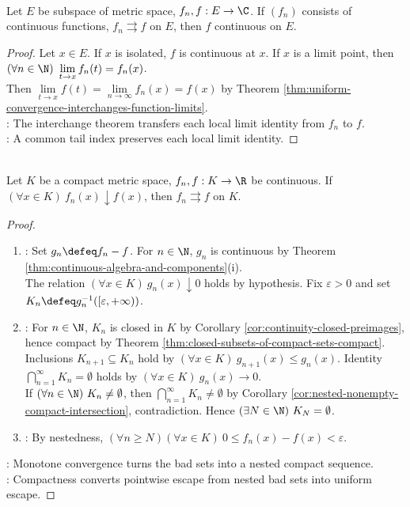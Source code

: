 \begin{theorem} \label{thm:uniform-convergence-preserves-continuity} \\
Let $E$ be subspace of metric space, $f_n,f:E\to\C$. If $(f_n)$ consists of continuous functions, $f_n\rightrightarrows f$ on $E$, then $f$ continuous on $E$.
\begin{proof}
Let $x\in E$. If $x$ is isolated, $f$ is continuous at $x$. If $x$ is a limit point, then $(\forall n\in\N)\ \lim\limits_{t\to x}f_n(t)=f_n(x)$.\\
Then $\lim\limits_{t\to x}f(t)=\lim\limits_{n\to\infty}f_n(x)=f(x)$ by Theorem \ref{thm:uniform-convergence-interchanges-function-limits}.\\
: The interchange theorem transfers each local limit identity from $f_n$ to $f$.\\
: A common tail index preserves each local limit identity.
\end{proof}
\end{theorem}

\begin{theorem} \label{thm:dini-monotone-uniform-convergence} \\
Let $K$ be a compact metric space, $f_n,f:K\to\R$ be continuous. If $(\forall x\in K)\ f_n(x)\downarrow f(x)$, then $f_n\rightrightarrows f$ on $K$.
\begin{proof}
\begin{enumerate}[label=(\roman*)]
\setlength{\itemsep}{0pt}
\item {}: Set $g_n\defeq f_n-f$. For $n\in\N$, $g_n$ is continuous by Theorem \ref{thm:continuous-algebra-and-components}(i).\\
The relation $(\forall x\in K)\ g_n(x)\downarrow0$ holds by hypothesis. Fix $\varepsilon>0$ and set $K_n\defeq g_n^{-1}([\varepsilon,+\infty))$.
\item {}: For $n\in\N$, $K_n$ is closed in $K$ by Corollary \ref{cor:continuity-closed-preimages}, hence compact by Theorem \ref{thm:closed-subsets-of-compact-sets-compact}.\\
Inclusions $K_{n+1}\subseteq K_n$ hold by $(\forall x\in K)\ g_{n+1}(x)\leq g_n(x)$. Identity $\bigcap\limits_{n=1}^{\infty}K_n=\emptyset$ holds by $(\forall x\in K)\ g_n(x)\to0$.\\
If $(\forall n\in\N)\ K_n\ne\emptyset$, then $\bigcap\limits_{n=1}^{\infty}K_n\ne\emptyset$ by Corollary \ref{cor:nested-nonempty-compact-intersection}, contradiction. Hence $(\exists N\in\N)\ K_N=\emptyset$.
\item {}: By nestedness, $(\forall n\geq N)(\forall x\in K)\ 0\leq f_n(x)-f(x)<\varepsilon$.
\end{enumerate}
: Monotone convergence turns the bad sets into a nested compact sequence.\\
: Compactness converts pointwise escape from nested bad sets into uniform escape.
\end{proof}
\end{theorem}

